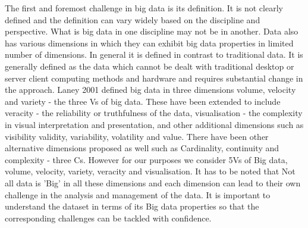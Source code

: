 The first and foremost challenge in big data is its definition.
It is not clearly defined and the definition can vary widely based on the discipline and perspective.
What is big data in one discipline may not be in another.
Data also has various dimensions in which they can exhibit big data properties in limited number of dimensions.
In general it is defined in contrast to traditional data.
It is generally defined as the data which cannot be dealt with traditional desktop or server client computing methods and hardware and requires substantial change in the approach.
Laney 2001 defined big data in three dimensions volume, velocity and variety - the three Vs of big data.
These have been extended to include veracity - the reliability or truthfulness of the data, visualisation - the complexity in visual interpretation and presentation, and other additional dimensions such as visibility validity, variability, volatility and value.
There have been other alternative dimensions proposed as well such as Cardinality, continuity and complexity - three Cs.
However for our purposes we consider 5Vs of Big data, volume, velocity, variety, veracity and visualisation.
It has to be noted that Not all data is 'Big' in all these dimensions and each dimension can lead to their own challenge in the analysis and management of the data.
It is important to understand the dataset in terms of its Big data properties so that the corresponding challenges can be tackled with confidence.


